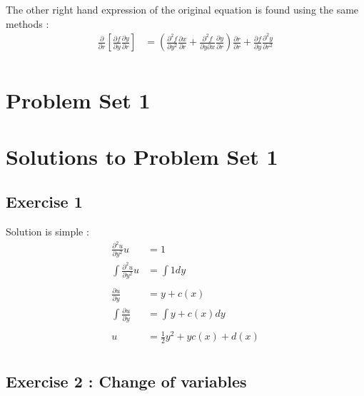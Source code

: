 The other right hand expression of the original equation is found using the same methods : 
\begin{align*}
    \frac{ \partial  }{ \partial r } \left[ \frac{ \partial f }{ \partial y } \frac{
    \partial y }{ \partial r } \right]  &= \left( \frac{ \partial ^2 f  }{ \partial y^2  } 
    \frac{ \partial x }{ \partial r } + \frac{ \partial ^2 f }{ \partial y \partial x } 
    \frac{ \partial y }{ \partial r } 
    \right) \frac{ \partial r }{ \partial r } + \frac{ \partial f }{ \partial y } \frac{
    \partial ^2 y }{ \partial r^2 } \\ 
\end{align*}









\section{Problem Set 1}
\label{sec:Problems Set 1}

\section{Solutions to Problem Set 1}
\label{sec:Solutions to Problem Set 1}
\subsection{Exercise 1}
\label{subsec:Exercise 1}
Solution is simple : 
\begin{align*}
    \frac{ \partial^2 u }{ \partial y^2 } u &= 1 \\ 
    \int\limits_{ }^{ } \frac{ \partial^2 u }{ \partial y^2 } u &= \int\limits_{ }^{ } 1 dy\\ 
    \frac{ \partial u }{ \partial y }  &= y + c(x)  \\ 
    \int\limits_{ }^{ } \frac{ \partial u }{ \partial y } &= \int\limits_{ }^{ } y + c(x)
    dy \\ 
    u &= \frac{ 1 }{ 2 } y^2 + yc(x) + d(x)  \\ 
\end{align*}
\subsection{Exercise 2 : Change of variables }
\label{subsec:Exercise 2 : Change of variables }
